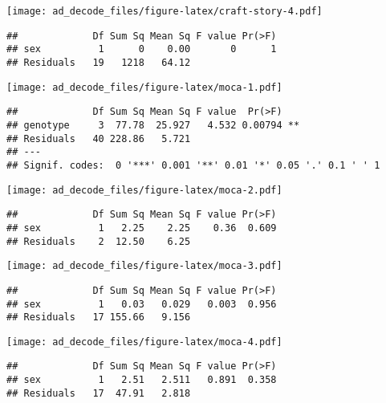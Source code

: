 \documentclass[
]{article}
\begin{document}
\texttt{[image: ad\_decode\_files/figure-latex/craft-story-4.pdf]}

\begin{verbatim}
##             Df Sum Sq Mean Sq F value Pr(>F)
## sex          1      0    0.00       0      1
## Residuals   19   1218   64.12
\end{verbatim}

\texttt{[image: ad\_decode\_files/figure-latex/moca-1.pdf]}

\begin{verbatim}
##             Df Sum Sq Mean Sq F value  Pr(>F)   
## genotype     3  77.78  25.927   4.532 0.00794 **
## Residuals   40 228.86   5.721                   
## ---
## Signif. codes:  0 '***' 0.001 '**' 0.01 '*' 0.05 '.' 0.1 ' ' 1
\end{verbatim}

\texttt{[image: ad\_decode\_files/figure-latex/moca-2.pdf]}

\begin{verbatim}
##             Df Sum Sq Mean Sq F value Pr(>F)
## sex          1   2.25    2.25    0.36  0.609
## Residuals    2  12.50    6.25
\end{verbatim}

\texttt{[image: ad\_decode\_files/figure-latex/moca-3.pdf]}

\begin{verbatim}
##             Df Sum Sq Mean Sq F value Pr(>F)
## sex          1   0.03   0.029   0.003  0.956
## Residuals   17 155.66   9.156
\end{verbatim}

\texttt{[image: ad\_decode\_files/figure-latex/moca-4.pdf]}

\begin{verbatim}
##             Df Sum Sq Mean Sq F value Pr(>F)
## sex          1   2.51   2.511   0.891  0.358
## Residuals   17  47.91   2.818
\end{verbatim}
\end{document}
